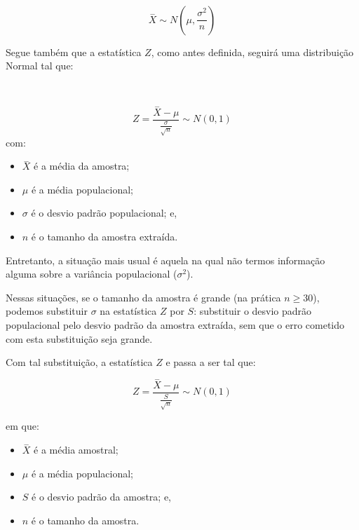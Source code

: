 \documentclass[
]{book}
\providecommand{\tightlist}{%
  \setlength{\itemsep}{0pt}\setlength{\parskip}{0pt}}
\begin{document}
~

\[
\stackrel{-}{X} \sim N(\mu, \frac{\sigma^{2}}{n})
\]

\hfill\break

Segue também que a estatística \(Z\), como antes definida, seguirá uma distribuição Normal tal que:

~

\[
Z = \frac{\stackrel{-}{X} - \mu}{\frac{\sigma}{\sqrt{n}}}  \sim N(0 ,1)
\]
com:

\hfill\break

\begin{itemize}
\tightlist
\item
  \(\stackrel{-}{X}\) é a média da amostra;\\
\item
  \(\mu\) é a média populacional;\\
\item
  \(\sigma\) é o desvio padrão populacional; e,\\
\item
  \(n\) é o tamanho da amostra extraída.
\end{itemize}

\hfill\break

Entretanto, a situação mais usual é aquela na qual não termos informação alguma sobre a variância populacional (\(\sigma^{2}\)).

\hfill\break

Nessas situações, se o tamanho da amostra é grande (na prática \(n\ge 30\)), podemos substituir \(\sigma\) na estatística \(Z\) por \(S\): substituir o desvio padrão populacional pelo desvio padrão da amostra extraída, sem que o erro cometido com esta substituição seja grande.

\hfill\break

Com tal substituição, a estatística \(Z\) e passa a ser tal que:

\hfill\break

\[
Z = \frac{\stackrel{-}{X} - \mu}{\frac{S}{\sqrt{n}}}  \sim N(0 , 1)
\]

\hfill\break

em que:

\hfill\break

\begin{itemize}
\tightlist
\item
  \(\stackrel{-}{X}\) é a média amostral;\\
\item
  \(\mu\) é a média populacional;\\
\item
  \(S\) é o desvio padrão da amostra; e,\\
\item
  \(n\) é o tamanho da amostra.
\end{itemize}
\end{document}
